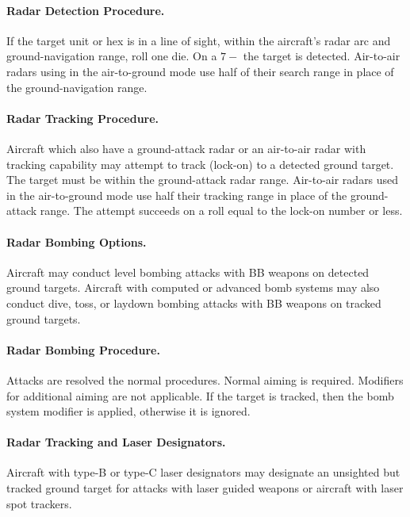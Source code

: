\begin{advancedrules}
{\paragraph{Radar Detection Procedure.} If the target unit or hex is in a line of sight, within the aircraft's radar arc and ground-navigation range, roll one die. On a $7-$ the target is detected. Air-to-air radars using in the air-to-ground mode use half of their search range in place of the ground-navigation range.

\paragraph{Radar Tracking Procedure.} Aircraft which also have a ground-attack radar or an air-to-air radar with tracking capability may attempt to track (lock-on) to a detected ground target. The target must be within the ground-attack radar range. Air-to-air radars used in the air-to-ground mode use half their tracking range in place of the ground-attack range. The attempt succeeds on a roll equal to the lock-on number or less.

\paragraph{Radar Bombing Options.} Aircraft may conduct level bombing attacks with BB weapons on detected ground targets. Aircraft with computed or advanced bomb systems may also conduct dive, toss, or laydown bombing attacks with BB weapons on tracked ground targets.

\paragraph{Radar Bombing Procedure.} Attacks are resolved the normal procedures. Normal aiming is required. Modifiers for additional aiming are not applicable. If the target is tracked, then the bomb system modifier is applied, otherwise it is ignored. 

\paragraph{Radar Tracking and Laser Designators.} Aircraft with type-B or type-C laser designators may designate an unsighted but tracked ground target for attacks with laser guided weapons or aircraft with laser spot trackers.


}



\end{advancedrules}
